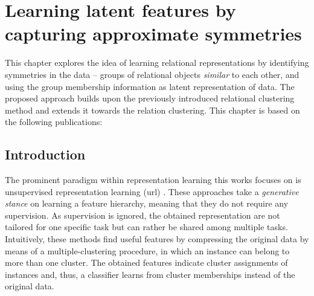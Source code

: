 \chapter{Learning latent features by capturing approximate symmetries}\label{ch:symmetries}

This chapter explores the idea of learning relational representations by identifying symmetries in the data -- groups of relational objects \textit{similar} to each other, and using the group membership information as latent representation of data.
The proposed approach builds upon the previously introduced relational clustering method and extends it towards the relation clustering.
This chapter is based on the following publications:

\begin{quote}
\end{quote}

\begin{quote}
\end{quote}

\begin{quote}
\end{quote}
 



\section{Introduction}




The prominent paradigm within representation learning this works focuses on is unsupervised representation learning (\gls{url}) \cite{Hinton504,Bengio07greedylayer-wise,RanzatoBL07}.
These approaches take a \textit{generative stance} on learning a feature hierarchy, meaning that they do not require any supervision.
As supervision is ignored, the obtained representation are not tailored for one specific task but can rather be shared among multiple tasks.
Intuitively, these methods find useful features by compressing the original data by means of a  multiple-clustering procedure, in which an instance can belong to more than one cluster.
The obtained features indicate cluster assignments of instances and, thus, a classifier learns from cluster memberships instead of the original data.



